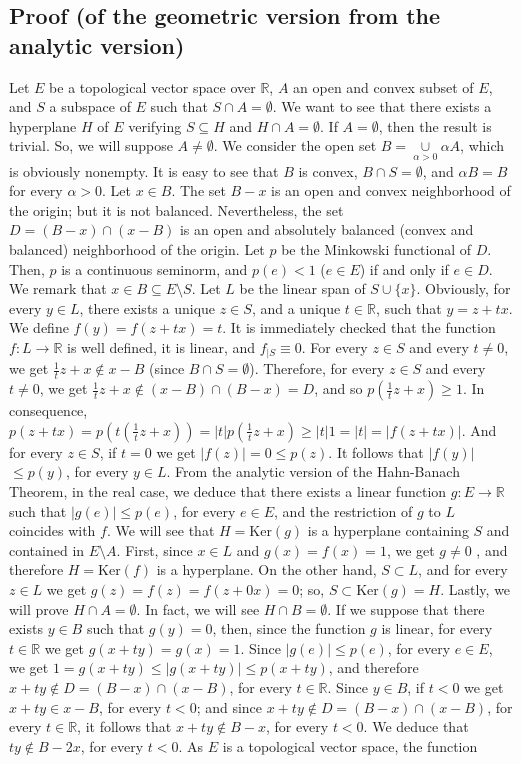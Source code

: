 \documentclass{article}
\begin{document}
\subsection{Proof (of the geometric version from the analytic version)}

Let $E$ be a topological vector space over $\mathbb{R}$, $A$ an open and convex subset of $E$, and $S$ a subspace of $E$ such that $S\cap A=\emptyset$. We want to see that there exists a hyperplane $H$ of $E$ verifying $S\subseteq H$ and $H\cap A=\emptyset$. If $A=\emptyset$, then the result is trivial. So, we will suppose $A\neq\emptyset$. We consider the open set $B=\underset{\alpha>0}{\cup}\alpha A$, which
is obviously nonempty. It is easy to see that $B$ is convex, $B\cap S=\emptyset$, and $\alpha B=B$ for every $\alpha>0$. Let $x\in B$. The set $B-x$ is an open and convex neighborhood of the origin; but it is not balanced. Nevertheless, the set $D=(B-x)\cap(x-B)$ is an open and absolutely balanced (convex and balanced) neighborhood of the origin. Let $p$ be the Minkowski functional of $D$. Then, $p$ is a continuous seminorm, and $p(e)<1$ ($e\in E$) if and only if $e\in D$. We remark that $x\in B\subseteq E\setminus S$. Let $L$ be the linear span of $S\cup\{x\}$. Obviously, for every $y\in L$, there exists a unique $z\in S$, and a unique $t\in\mathbb{R}$, such that $y=z+tx$. We define $f(y)=f(z+tx)=t$. It is immediately checked that the function $f:L\rightarrow\mathbb{R}$ is well defined, it is linear, and $f_{|S}\equiv 0$. For every $z\in S$ and every $t\neq0$, we get $\frac{1}{t}z+x\notin x-B$ (since $B\cap S=\emptyset$). Therefore, for every $z\in S$ and every $t\neq0$, we get $\frac{1}{t}z+x\notin(x-B)\cap(B-x)=D$, and so $p(\frac{1}{t}z+x)\geq 1$. In consequence, $p(z+tx)=p(t(\frac{1}{t}z+x))=\vert t\vert p(\frac{1}{t}z+x)\geq\vert t\vert 1=\vert t\vert =\vert f(z+tx)\vert$. And for every $z\in S$, if $t=0$ we get $\vert f(z)\vert=0\leq p(z)$. It follows that $\vert f(y)\vert $ $\leq p(y)$, for every $y\in L$. From the analytic version of the Hahn-Banach Theorem, in the real case, we deduce that there exists a linear function $g:E\rightarrow\mathbb{R}$ such that $\vert g(e)\vert\leq p(e)$, for every $e\in E$, and the restriction of $g$ to $L$ coincides with $f$. We will see that $H=\text{Ker}(g)$ is a hyperplane containing $S$ and contained in $E\setminus A$. First, since $x\in L$ and $g(x)=f(x)=1$, we get $g\neq0$ , and therefore $H=\text{Ker}(f)$ is a hyperplane. On the other hand, $S\subset L$, and for every $z\in L$ we get $g(z)=f(z)=f(z+0x)=0$; so, $S\subset\text{Ker}(g)=H$. Lastly, we will prove $H\cap A=\emptyset$. In fact, we will see $H\cap B=\emptyset$. If we suppose that there exists $y\in B$ such that $g(y)=0$, then, since the function $g$ is linear, for every $t\in\mathbb{R}$ we get $g(x+ty)=g(x)=1$. Since $\vert g(e)\vert\leq p(e)$, for every $e\in E$,  we get $1=g(x+ty)\leq\vert g(x+ty)\vert\leq p(x+ty)$, and therefore $x+ty\notin D=(B-x)\cap(x-B)$, for every $t\in\mathbb{R}$. Since $y\in B$, if $t<0$ we get $x+ty\in x-B$, for every $t<0$; and since $x+ty\notin D=(B-x)\cap(x-B)$, for every $t\in\mathbb{R}$, it follows that $x+ty\notin B-x$, for every $t<0$. We deduce that $ty\notin B-2x$, for every $t<0$. As $E$ is a topological vector space, the function 
\end{document}
